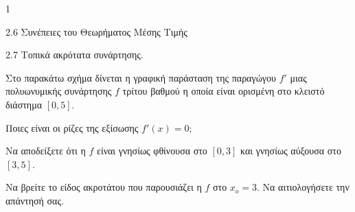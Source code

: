 \begin{ylh}{1}
    \item 2.6 Συνέπειες του Θεωρήματος Μέσης Τιμής
    \item 2.7 Τοπικά ακρότατα συνάρτησης.
\end{ylh}
\begin{figure} %
\centering
{}
\end{figure}
Στο παρακάτω σχήμα δίνεται η γραφική παράσταση της παραγώγου $f'$ μιας πολυωνυμικής συνάρτησης $f$ τρίτου βαθμού η οποία είναι ορισμένη στο κλειστό διάστημα $[0,5]$.
\begin{alist}
\item Ποιες είναι οι ρίζες της εξίσωσης $f'(x) = 0$; 
\item Να αποδείξετε ότι η $f$ είναι γνησίως φθίνουσα στο $[0,3]$ και γνησίως αύξουσα στο $[3,5]$. 
\item Να βρείτε το είδος ακροτάτου που παρουσιάζει η $f$ στο $x_o = 3$. Να αιτιολογήσετε την απάντησή σας. 
\end{alist}